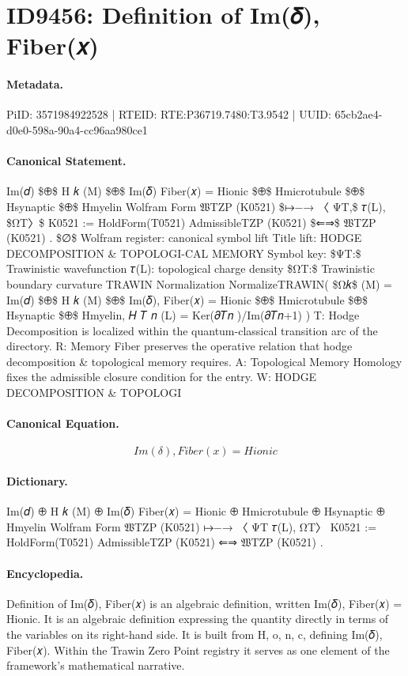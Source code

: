 \section*{ID9456: Definition of Im(𝛿), Fiber(𝑥)}
\paragraph{Metadata.}
PiID: 3571984922528 | RTEID: RTE:P36719.7480:T3.9542 | UUID: 65cb2ae4-d0e0-598a-90a4-cc96aa980ce1

\paragraph{Canonical Statement.}
Im(𝑑) \$⊕\$ H 𝑘 (M) \$⊕\$ Im(𝛿) Fiber(𝑥) = Hionic \$⊕\$ Hmicrotubule \$⊕\$ Hsynaptic \$⊕\$ Hmyelin Wolfram Form 𝔚TZP (K0521) \$↦−→ 〈 ΨT,\$ 𝜏(L), \$ΩT〉\$ K0521 := HoldForm(T0521) AdmissibleTZP (K0521) \$⇐⇒\$ 𝔚TZP (K0521) . \$∅\$ Wolfram register: canonical symbol lift Title lift: HODGE DECOMPOSITION \& TOPOLOGI-CAL MEMORY Symbol key: \$ΨT:\$ Trawinistic wavefunction 𝜏(L): topological charge density \$ΩT:\$ Trawinistic boundary curvature TRAWIN Normalization NormalizeTRAWIN( \$Ω𝑘\$ (M) = Im(𝑑) \$⊕\$ H 𝑘 (M) \$⊕\$ Im(𝛿), Fiber(𝑥) = Hionic \$⊕\$ Hmicrotubule \$⊕\$ Hsynaptic \$⊕\$ Hmyelin, 𝐻 𝑇 𝑛 (L) = Ker(𝜕𝑇𝑛 )/Im(𝜕𝑇𝑛+1) ) T: Hodge Decomposition is localized within the quantum-classical transition arc of the directory. R: Memory Fiber preserves the operative relation that hodge decomposition \& topological memory requires. A: Topological Memory Homology fixes the admissible closure condition for the entry. W: HODGE DECOMPOSITION \& TOPOLOGI

\paragraph{Canonical Equation.}
\[
Im(𝛿), Fiber(𝑥) = Hionic
\]

\paragraph{Dictionary.}
Im(𝑑) ⊕ H 𝑘 (M) ⊕ Im(𝛿) Fiber(𝑥) = Hionic ⊕ Hmicrotubule ⊕ Hsynaptic ⊕ Hmyelin Wolfram Form 𝔚TZP (K0521) ↦−→ 〈 ΨT 𝜏(L), ΩT〉 K0521 := HoldForm(T0521) AdmissibleTZP (K0521) ⇐⇒ 𝔚TZP (K0521) .

\paragraph{Encyclopedia.}
Definition of Im(𝛿), Fiber(𝑥) is an algebraic definition, written Im(𝛿), Fiber(𝑥) = Hionic. It is an algebraic definition expressing the quantity directly in terms of the variables on its right-hand side. It is built from H, o, n, c, defining Im(𝛿), Fiber(𝑥). Within the Trawin Zero Point registry it serves as one element of the framework's mathematical narrative.
